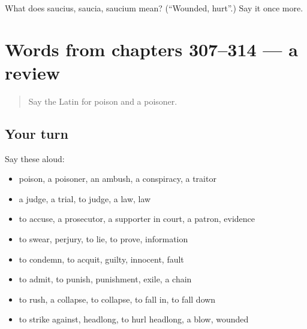 \begin{tcolorbox}[breakable,colback=teal!4,colframe=teal!35!black,title={Before you move on}]
What does saucius, saucia, saucium mean? (\textquotedblleft{}Wounded, hurt\textquotedblright{}.) Say it once more.
\end{tcolorbox}
\section[(dialogue)]{Words from chapters 307–314 — a review}

\label{lesson:LA-R314-review-307-314}



\begin{quote}
Say the Latin for poison and a poisoner.
\end{quote}

\subsection*{Your turn}
Say these aloud:

\begin{itemize}
\raggedright
  \item poison, a poisoner, an ambush, a conspiracy, a traitor
  \item a judge, a trial, to judge, a law, law
  \item to accuse, a prosecutor, a supporter in court, a patron, evidence
  \item to swear, perjury, to lie, to prove, information
  \item to condemn, to acquit, guilty, innocent, fault
  \item to admit, to punish, punishment, exile, a chain
  \item to rush, a collapse, to collapse, to fall in, to fall down
  \item to strike against, headlong, to hurl headlong, a blow, wounded
\end{itemize}

